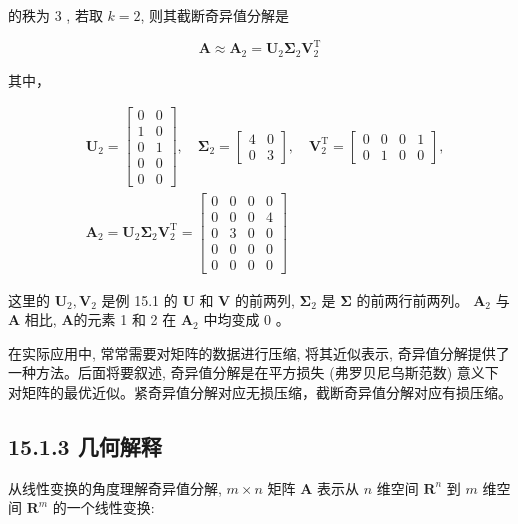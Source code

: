 \documentclass[10pt]{article}
\begin{document}
的秩为 3 , 若取 $k=2$, 则其截断奇异值分解是

$$
\boldsymbol{A} \approx \boldsymbol{A}_{2}=\boldsymbol{U}_{2} \boldsymbol{\Sigma}_{2} \boldsymbol{V}_{2}^{\mathrm{T}}
$$

其中，

$$
\begin{aligned}
& \boldsymbol{U}_{2}=\left[\begin{array}{ll}
0 & 0 \\
1 & 0 \\
0 & 1 \\
0 & 0 \\
0 & 0
\end{array}\right], \quad \boldsymbol{\Sigma}_{2}=\left[\begin{array}{ll}
4 & 0 \\
0 & 3
\end{array}\right], \quad \boldsymbol{V}_{2}^{\mathrm{T}}=\left[\begin{array}{llll}
0 & 0 & 0 & 1 \\
0 & 1 & 0 & 0
\end{array}\right], \\
& \boldsymbol{A}_{2}=\boldsymbol{U}_{2} \boldsymbol{\Sigma}_{2} \boldsymbol{V}_{2}^{\mathrm{T}}=\left[\begin{array}{llll}
0 & 0 & 0 & 0 \\
0 & 0 & 0 & 4 \\
0 & 3 & 0 & 0 \\
0 & 0 & 0 & 0 \\
0 & 0 & 0 & 0
\end{array}\right]
\end{aligned}
$$

这里的 $\boldsymbol{U}_{2}, \boldsymbol{V}_{2}$ 是例 15.1 的 $\boldsymbol{U}$ 和 $\boldsymbol{V}$ 的前两列, $\boldsymbol{\Sigma}_{2}$ 是 $\boldsymbol{\Sigma}$ 的前两行前两列。 $\boldsymbol{A}_{2}$ 与 $\boldsymbol{A}$ 相比, $\boldsymbol{A}$的元素 1 和 2 在 $\boldsymbol{A}_{2}$ 中均变成 0 。

在实际应用中, 常常需要对矩阵的数据进行压缩, 将其近似表示, 奇异值分解提供了一种方法。后面将要叙述, 奇异值分解是在平方损失 (弗罗贝尼乌斯范数) 意义下对矩阵的最优近似。紧奇异值分解对应无损压缩，截断奇异值分解对应有损压缩。

\subsection*{15.1.3 几何解释}
从线性变换的角度理解奇异值分解, $m \times n$ 矩阵 $\boldsymbol{A}$ 表示从 $n$ 维空间 $\boldsymbol{R}^{n}$ 到 $m$ 维空间 $\boldsymbol{R}^{m}$ 的一个线性变换:
\end{document}

